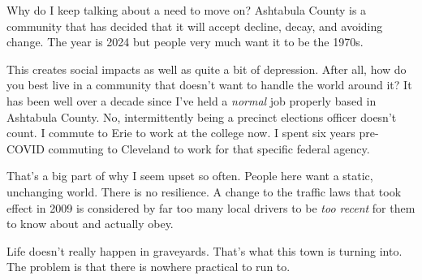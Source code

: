 Why do I keep talking about a need to move on? Ashtabula County is a
community that has decided that it will accept decline, decay, and
avoiding change. The year is 2024 but people very much want it to be the
1970s.

This creates social impacts as well as quite a bit of depression. After
all, how do you best live in a community that doesn't want to handle the
world around it? It has been well over a decade since I've held a
\emph{normal} job properly based in Ashtabula County. No, intermittently
being a precinct elections officer doesn't count. I commute to Erie to
work at the college now. I spent six years pre-COVID commuting to
Cleveland to work for that specific federal agency.

That's a big part of why I seem upset so often. People here want a
static, unchanging world. There is no resilience. A change to the
traffic laws that took effect in 2009 is considered by far too many
local drivers to be \emph{too recent} for them to know about and
actually obey.

Life doesn't really happen in graveyards. That's what this town is
turning into. The problem is that there is nowhere practical to run to.
